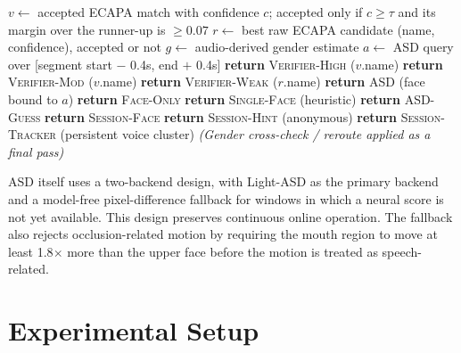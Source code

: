 \documentclass[conference]{IEEEtran}
\begin{document}
\begin{algorithm}[h]
\caption{Speaker attribution cascade (simplified)}
\label{alg:cascade}
\begin{algorithmic}[1]
\STATE $v \gets$ accepted ECAPA match with confidence $c$; accepted only
  if $c \geq \tau$ and its margin over the runner-up is $\geq 0.07$
\STATE $r \gets$ best raw ECAPA candidate (name, confidence), accepted or not
\STATE $g \gets$ audio-derived gender estimate
\STATE $a \gets$ ASD query over [segment start $-$ 0.4s, end $+$ 0.4s]
  \STATE \textbf{return} \textsc{Verifier-High} ($v$.name)
  \STATE \textbf{return} \textsc{Verifier-Mod} ($v$.name)
  \STATE \textbf{return} \textsc{Verifier-Weak} ($r$.name)
  \STATE \textbf{return} \textsc{ASD} (face bound to $a$)
  \STATE \textbf{return} \textsc{Face-Only}
  \STATE \textbf{return} \textsc{Single-Face} (heuristic)
  \STATE \textbf{return} \textsc{ASD-Guess}
  \STATE \textbf{return} \textsc{Session-Face}
  \STATE \textbf{return} \textsc{Session-Hint} (anonymous)
\ELSE
  \STATE \textbf{return} \textsc{Session-Tracker} (persistent voice cluster)
\ENDIF
\STATE \textit{(Gender cross-check / reroute applied as a final pass)}
\end{algorithmic}
\end{algorithm}

ASD itself uses a two-backend design, with Light-ASD
\cite{liao2023lightasd} as the primary backend and a model-free
pixel-difference fallback for windows in which a neural score is not
yet available. This design preserves continuous online operation. The
fallback also rejects occlusion-related motion by requiring the mouth
region to move at least 1.8$\times$ more than the upper face before the
motion is treated as speech-related.

\section{Experimental Setup}
\label{sec:setup}
\end{document}
